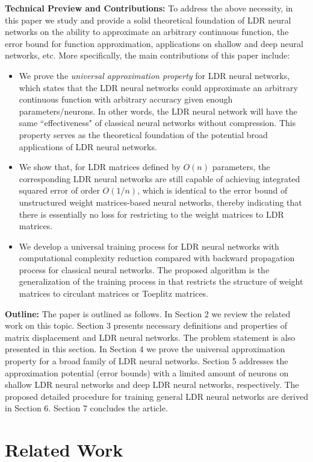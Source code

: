 \documentclass{article}
\begin{document}
\textbf{Technical Preview and Contributions:} To address the above necessity, in this paper we study and provide a solid theoretical foundation of LDR neural networks on the ability to approximate an arbitrary continuous function, the error bound for function approximation, applications on shallow and deep neural networks, etc. More specifically, the main contributions of this paper include:
\begin{itemize}
\item
We prove the \emph{universal approximation property} for LDR neural networks, which states that the LDR neural networks could approximate an arbitrary continuous function with arbitrary accuracy given enough parameters/neurons. In other words, the LDR neural network will have the same ``effectiveness" of classical neural networks without compression. This property serves as the theoretical foundation of the potential broad applications of LDR neural networks.
\item
We show that, for LDR matrices defined by $O(n)$ parameters, the corresponding LDR neural networks are still capable of achieving integrated squared error of order $O(1/n)$, which is identical to the error bound of unstructured weight matrices-based neural networks, thereby indicating that there is essentially no loss for restricting to the weight matrices to LDR matrices.
\item
We develop a universal training process for LDR neural networks with computational complexity reduction compared with backward propagation process for classical neural networks. The proposed algorithm is the generalization of the training process in \cite{cheng2015exploration}\cite{sindhwani2015structured} that restricts the structure of weight matrices to circulant matrices or Toeplitz matrices.
\end{itemize}
\textbf{Outline:} The paper is outlined as follows. In Section 2 we review the related work on this topic. Section 3 presents necessary definitions and properties of matrix displacement and LDR neural networks. The problem statement is also presented in this section. In Section 4 we prove the universal approximation property for a broad family of LDR neural networks. Section 5 addresses the approximation potential (error bounds) with a limited amount of neurons on shallow LDR neural networks and deep LDR neural networks, respectively. The proposed detailed procedure for training general LDR neural networks are derived in Section 6. Section 7 concludes the article.

\section{Related Work}
\label{srw}
\end{document}
